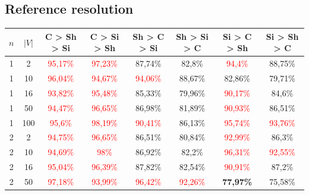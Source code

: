 \subsection{Reference resolution}

\begin{table}[ht]
    \centering
    \begin{tabular}{cc|c|c|c|c|c|c}
        \toprule
        $n$ & $|V|$ & \textbf{C > Sh > Si}              & \textbf{C > Si > Sh}              & \textbf{Sh > C > Si}     & \textbf{Sh > Si > C}     & \textbf{Si > C > Sh}     & \textbf{Si > Sh > C}     \\\midrule
        {1} & {2}   & \textcolor{red}{95,17\%}          & \textcolor{red}{97,23\%}          & {87,74\%}                & {82,8\%}                 & \textcolor{red}{94,4\%}  & {88,75\%}                \\
        {1} & {10}  & \textcolor{red}{96,04\%}          & \textcolor{red}{94,67\%}          & \textcolor{red}{94,06\%} & {88,67\%}                & {82,86\%}                & {79,71\%}                \\
        {1} & {16}  & \textcolor{red}{93,82\%}          & \textcolor{red}{95,48\%}          & {85,33\%}                & {79,96\%}                & \textcolor{red}{90,17\%} & {84,6\%}                 \\
        {1} & {50}  & \textcolor{red}{94,47\%}          & \textcolor{red}{96,65\%}          & {86,98\%}                & {81,89\%}                & \textcolor{red}{90,93\%} & {86,51\%}                \\
        {1} & {100} & \textcolor{red}{95,6\%}           & \textcolor{red}{98,19\%}          & \textcolor{red}{90,41\%} & {86,13\%}                & \textcolor{red}{95,74\%} & \textcolor{red}{93,76\%} \\
        {2} & {2}   & \textcolor{red}{94,75\%}          & \textcolor{red}{96,65\%}          & {86,51\%}                & {80,84\%}                & \textcolor{red}{92,99\%} & {86,3\%}                 \\
        {2} & {10}  & \textcolor{red}{94,69\%}          & \textcolor{red}{98\%}             & {86,92\%}                & {82,2\%}                 & \textcolor{red}{96,31\%} & \textcolor{red}{92,55\%} \\
        {2} & {16}  & \textcolor{red}{95,04\%}          & \textcolor{red}{96,39\%}          & {87,82\%}                & {82,54\%}                & \textcolor{red}{90,91\%} & {87,2\%}                 \\
        {2} & {50}  & \textcolor{red}{97,18\%}          & \textcolor{red}{93,99\%}          & \textcolor{red}{96,42\%} & \textcolor{red}{92,26\%} & \textbf{77,97\%}         & {75,58\%}                \\

\end{tabular}
\end{table}
